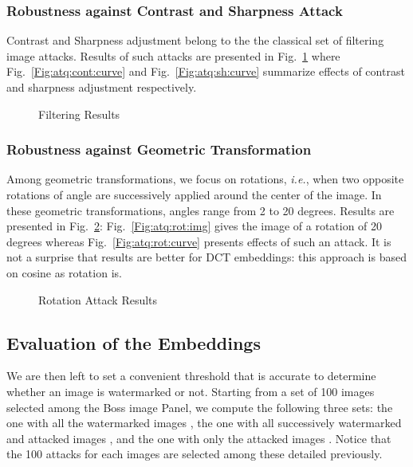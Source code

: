 \documentclass{comjnl}
\begin{document}
\subsubsection{Robustness against Contrast and Sharpness Attack}
Contrast and Sharpness adjustment belong to the the classical set of 
filtering image attacks.
Results of such attacks are presented in 
Fig.~\ref{Fig:atq:fil} where 
Fig.~\ref{Fig:atq:cont:curve} and Fig.~\ref{Fig:atq:sh:curve} summarize 
effects of contrast and sharpness adjustment respectively. 


\begin{figure}[ht]
  \centering
\caption{Filtering Results}
\label{Fig:atq:fil}
\end{figure}

\subsubsection{Robustness against Geometric Transformation}
Among geometric transformations, we focus on  
rotations, \textit{i.e.}, when two opposite rotations 
of angle  are successively applied around the center of the image.
In these geometric transformations,  angles range from 2 to 20 
degrees.  
Results are presented in Fig.~\ref{Fig:atq:rot}: Fig.~\ref{Fig:atq:rot:img}
gives the image of a rotation of 20 degrees whereas
Fig.~\ref{Fig:atq:rot:curve} presents effects of such an attack.
It is not a surprise that results are better for DCT embeddings: this approach
is based on cosine as rotation is. 



\begin{figure}[ht]
  \centering


\caption{Rotation Attack Results}
\label{Fig:atq:rot}
\end{figure}

\subsection{Evaluation of the  Embeddings}\label{sub:roc}
We are then left to set a convenient threshold that is accurate to 
determine whether an image is watermarked or not.
Starting from a set of 100 images selected among the Boss image Panel,
we compute the following three sets: 
the one with all the watermarked images ,
the one with all successively watermarked and attacked images ,
and the one with only the attacked images .
Notice that the 100 attacks for each images 
are selected among these detailed previously.
\end{document}
